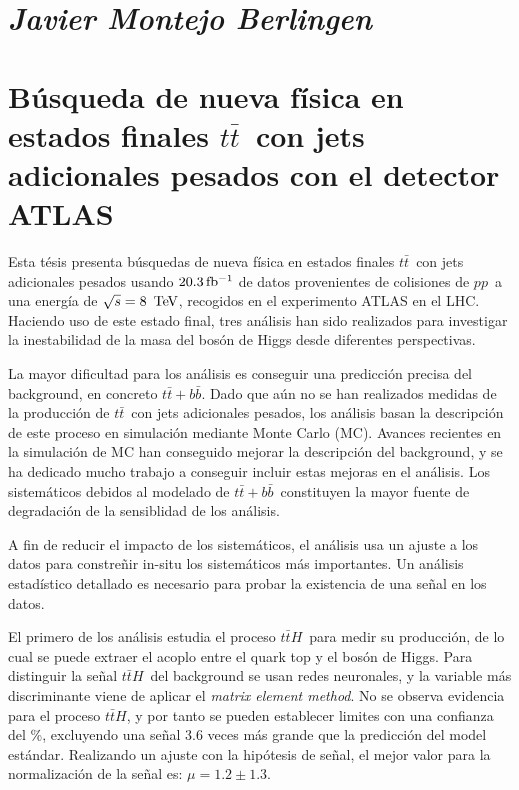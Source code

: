 \documentclass{article}
\def\ttH{\ensuremath{t\bar{t}H}}
\def\ttbar{\ensuremath{t\bar{t}}}
\def\ttbb{\ensuremath{t\bar{t}+b\bar{b}}}
\def\tev{\ifmmode {\mathrm{\ Te\kern -0.1em V}}\else
                   \textrm{Te\kern -0.1em V}\fi}%
\def\pp{\ensuremath{pp}}
\begin{document}
\section*{\textit{Javier Montejo Berlingen}}
\section*{B\'usqueda de nueva f\'isica en estados finales \ttbar\ con jets adicionales pesados con el detector ATLAS}

Esta t\'esis presenta b\'usquedas de nueva f\'isica en estados finales \ttbar\ con
jets adicionales pesados usando $\unit[20.3]{fb^{-1}}$ de datos provenientes
de colisiones de \pp\ a una energ\'ia de $\sqrt{s} = \unit[8]{\tev}$, recogidos
en el experimento ATLAS en el LHC.
Haciendo uso de este estado final, tres an\'alisis han sido realizados para
investigar la inestabilidad de la masa del bos\'on de Higgs desde diferentes
perspectivas. 

La mayor dificultad para los an\'alisis es conseguir una predicci\'on precisa del
background, en concreto \ttbb.
Dado que a\'un no se han realizados medidas de la producci\'on de \ttbar\ con jets
adicionales pesados, los an\'alisis basan la descripci\'on de este proceso en
simulaci\'on mediante Monte Carlo (MC).
Avances recientes en la simulaci\'on de MC han conseguido mejorar la descripci\'on
del background, y se ha dedicado mucho trabajo a conseguir incluir estas
mejoras en el an\'alisis.
Los sistem\'aticos debidos al modelado de \ttbb\ constituyen la mayor fuente de
degradaci\'on de la sensiblidad de los an\'alisis.

A fin de reducir el impacto de los sistem\'aticos, el an\'alisis usa un ajuste a
los datos para constre\~nir in-situ los sistem\'aticos m\'as importantes.
Un an\'alisis estad\'istico detallado es necesario para probar la existencia de
una se\~nal en los datos.

El primero de los an\'alisis estudia el proceso \ttH\ para medir su producci\'on,
de lo cual se puede extraer el acoplo entre el quark top y el bos\'on de Higgs.
Para distinguir la se\~nal \ttH\ del background se usan redes neuronales, y la
variable m\'as discriminante viene de aplicar el \textit{matrix element method}.
No se observa evidencia para el proceso \ttH, y por tanto se pueden establecer
limites con una confianza del \unit[95]{\%}, excluyendo una se\~nal 3.6 veces
m\'as grande que la predicci\'on del model est\'andar. Realizando un ajuste con la
hip\'otesis de se\~nal, el mejor valor para la normalizaci\'on de la se\~nal es: $\mu=
1.2 \pm 1.3$.
\end{document}
